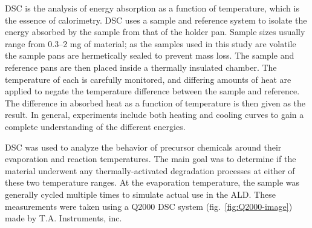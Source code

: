 DSC is the analysis of energy absorption as a function of temperature, which is the essence of calorimetry. DSC uses a sample and reference system to isolate the energy absorbed by the sample from that of the holder pan. Sample sizes usually range from 0.3--2 mg of material; as the samples used in this study are volatile the sample pans are hermetically sealed to prevent mass loss. The sample and reference pans are then placed inside a thermally insulated chamber. The temperature of each is carefully monitored, and differing amounts of heat are applied to negate the temperature difference between the sample and reference. The difference in absorbed heat as a function of temperature is then given as the result. In general, experiments include both heating and cooling curves to gain a complete understanding of the different energies. 
	
DSC was used to analyze the behavior of precursor chemicals around their evaporation and reaction temperatures. The main goal was to determine if the material underwent any thermally-activated degradation processes at either of these two temperature ranges. At the evaporation temperature, the sample was generally cycled multiple times to simulate actual use in the ALD. These measurements were taken using a Q2000 DSC system (fig.~\ref{fig:Q2000-image}) made by T.A. Instruments, inc.	
	

































	
	
	